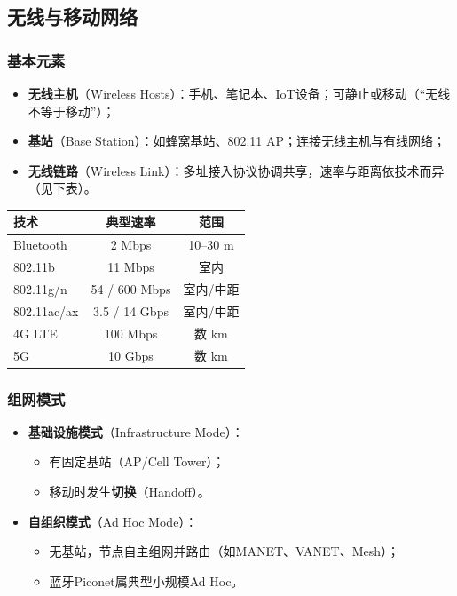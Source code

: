 \subsection{无线与移动网络}

\subsubsection{基本元素}

\begin{itemize}
    \item \textbf{无线主机}（Wireless Hosts）：手机、笔记本、IoT设备；可静止或移动（“无线不等于移动”）；
    \item \textbf{基站}（Base Station）：如蜂窝基站、802.11 AP；连接无线主机与有线网络；
    \item \textbf{无线链路}（Wireless Link）：多址接入协议协调共享，速率与距离依技术而异（见下表）。
\end{itemize}

\begin{center}
    \begin{tabular}{lcc}
        技术          & 典型速率          & 范围      \\
        \hline
        Bluetooth   & 2 Mbps        & 10–30 m \\
        802.11b     & 11 Mbps       & 室内      \\
        802.11g/n   & 54 / 600 Mbps & 室内/中距   \\
        802.11ac/ax & 3.5 / 14 Gbps & 室内/中距   \\
        4G LTE      & 100 Mbps      & 数 km    \\
        5G          & 10 Gbps       & 数 km    \\
    \end{tabular}
\end{center}

\subsubsection{组网模式}

\begin{itemize}
    \item \textbf{基础设施模式}（Infrastructure Mode）：
          \begin{itemize}
              \item 有固定基站（AP/Cell Tower）；
              \item 移动时发生\textbf{切换}（Handoff）。
          \end{itemize}
    \item \textbf{自组织模式}（Ad Hoc Mode）：
          \begin{itemize}
              \item 无基站，节点自主组网并路由（如MANET、VANET、Mesh）；
              \item 蓝牙Piconet属典型小规模Ad Hoc。
          \end{itemize}
\end{itemize}

\newpage